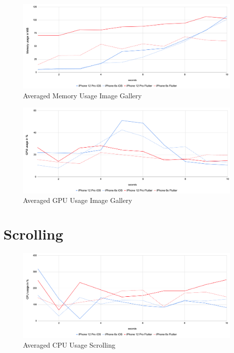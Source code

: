 \begin{figure}[!htbp]
    \centering
    \includegraphics[width=\linewidth]{images/performance_results/image_gallery/avg_memory_usage_image_gallery.png}
    \caption{Averaged Memory Usage Image Gallery}
    \label{fig:avg_memory_usage_image_gallery}
\end{figure}

\begin{figure}[!htbp]
    \centering
    \includegraphics[width=\linewidth]{images/performance_results/image_gallery/avg_gpu_usage_image_gallery.png}
    \caption{Averaged GPU Usage Image Gallery}
    \label{fig:avg_gpu_usage_detail_view}
\end{figure}
\FloatBarrier

\section{Scrolling}

\begin{figure}[!htbp]
    \centering
    \includegraphics[width=\linewidth]{images/performance_results/image_gallery/avg_cpu_usage_image_gallery.png}
    \caption{Averaged CPU Usage Scrolling}
    \label{fig:avg_cpu_usage_scrolling}
\end{figure}

